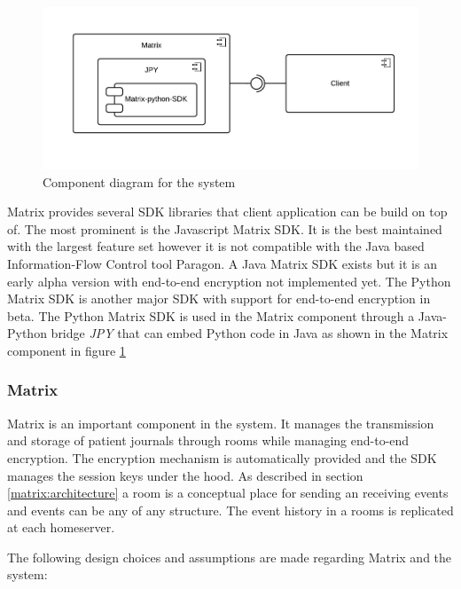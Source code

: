 \begin{figure}[H] 
	\hspace*{-1cm}
	\centering
	\includegraphics[width=14cm]{figures/matrix_component.png}
	\caption{Component diagram for the system}
	\label{fig:matrix_component}
\end{figure}

Matrix provides several SDK libraries that client application can be build on top of. The most prominent is the Javascript Matrix SDK. It is the best maintained with the largest feature set however it is not compatible with the Java based Information-Flow Control tool Paragon. A Java Matrix SDK exists but it is an early alpha version with end-to-end encryption not implemented yet. The Python Matrix SDK is another major SDK with support for end-to-end encryption in beta. The Python Matrix SDK is used in the Matrix component through a Java-Python bridge \emph{JPY} that can embed Python code in Java as shown in the Matrix component in figure \ref{fig:matrix_component} 




\subsubsection{Matrix}
Matrix is an important component in the system. It manages the transmission and storage of patient journals through rooms while managing end-to-end encryption. The encryption mechanism is automatically provided and the SDK manages the session keys under the hood.  As described in section \ref{matrix:architecture} a room is a conceptual place for sending an receiving events and events can be any of any structure. The event history in a rooms is replicated at each homeserver. 

The following design choices and assumptions are made regarding Matrix and the system: 

